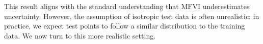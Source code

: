 \documentclass{article}
\theoremstyle{plain}
\newtheorem{lemma}[theorem]{Lemma}
\theoremstyle{definition}
\theoremstyle{remark}
\theoremstyle{plain}
\newcommand{\I}{\mathbb{I}}
\newcommand{\expectation}[2]{\mathbb{E}_{#1}\left[#2\right]}
\newcommand{\posterior}{\Sigma}
\newcommand{\Tr}[1]{\text{Tr}\left(#1\right)}
\begin{document}
This result aligns with the standard understanding that MFVI underestimates uncertainty. However, the assumption of isotropic test data is often unrealistic: in practice, we expect test points to follow a similar distribution to the training data. We now turn to this more realistic setting.











\end{document}
